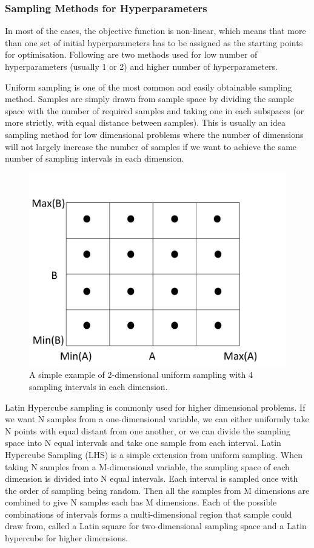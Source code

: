 \documentclass[14pt]{report}
\numberwithin{equation}{chapter}
\begin{document}
\begin{spacing}{2}
\subsubsection{Sampling Methods for Hyperparameters}
In most of the cases, the objective function is non-linear, which means that more than one set of initial hyperparameters has to be assigned as the starting points for optimisation. Following are two methods used for low number of hyperparameters (usually 1 or 2) and higher number of hyperparameters.


Uniform sampling is one of the most common and easily obtainable sampling method. Samples are simply drawn from sample space by dividing the sample space with the number of required samples and taking one in each subspaces (or more strictly, with equal distance between samples). This is usually an idea sampling method for low dimensional problems where the number of dimensions will not largely increase the number of samples if we want to achieve the same number of sampling intervals in each dimension. 

\begin{figure}
\centering
\includegraphics[scale=0.3]{Uniform_sampling.pdf}
\caption{A simple example of 2-dimensional uniform sampling with 4 sampling intervals in each dimension.}
\end{figure}


Latin Hypercube sampling is commonly used for higher dimensional problems. If we want N samples from a one-dimensional variable, we can either uniformly take N points with equal distant from one another, or we can divide the sampling space into N equal intervals and take one sample from each interval. Latin Hypercube Sampling (LHS) is a simple extension from uniform sampling. When taking N samples from a M-dimensional variable, the sampling space of each dimension is divided into N equal intervals. Each interval is sampled once with the order of sampling being random. Then all the samples from M dimensions are combined to give N samples each has M dimensions. Each of the possible combinations of intervals forms a multi-dimensional region that sample could draw from, called a Latin square for two-dimensional sampling space and a Latin hypercube for higher dimensions. 


\end{spacing}
\end{document}
